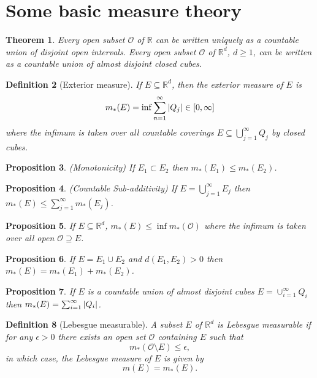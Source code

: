 \documentclass[11pt, letter]{book}
\newtheorem{theorem}{Theorem}[section]
\newtheorem{definition}[theorem]{Definition}
\newtheorem{proposition}[theorem]{Proposition}
\newcommand\R{\mathbb{R}}
\begin{document}



\section{Some basic measure theory}\label{sec:measure_theory}
\begin{theorem}
Every open subset $\mathcal{O}$ of $\mathbb{R}$ can be written uniquely as a countable union of disjoint open intervals. Every open subset $\mathcal{O}$ of $\mathbb{R}^d$, $d\geq 1$, can be written as a countable union of almost disjoint closed cubes. 
\end{theorem}
\begin{definition}[Exterior measure]
If $E \subseteq \mathbb{R}^d$, then the exterior measure of $E$ is 
\begin{equation*}
    m_*(E) = \inf \sum^\infty_{n=1}\abs{Q_j} \in [0,\infty]
\end{equation*}
where the infimum is taken over all countable coverings $E\subseteq \bigcup^\infty_{j=1} Q_j$ by closed cubes.
\end{definition}
\begin{proposition}
(Monotonicity) If $E_1 \subset E_2$ then $m_*(E_1)\leq m_*(E_2)$.
\end{proposition}
\begin{proposition}
(Countable Sub-additivity) If $E = \bigcup^\infty_{j=1} E_j$ then $m_*(E) \leq \sum^\infty_{j=1} m_*(E_j)$.
\end{proposition}
\begin{proposition}
If $E \subseteq \mathbb{R}^d$, $m_*(E) \leq \inf m_*(\mathcal{O})$ where the infimum is taken over all open $\mathcal{O} \supseteq E$. 
\end{proposition}
\begin{proposition}
If $E = E_1 \cup E_2$ and $d(E_1, E_2) > 0$ then $m_*(E) = m_*(E_1) + m_*(E_2)$.
\end{proposition}
\begin{proposition}
If $E$ is a countable union of almost disjoint cubes $E = \cup^\infty_{i=1}Q_i$ then $m_*(E) = \sum^\infty_{i=1}\abs{Q_i}$.
\end{proposition}
\begin{definition}[Lebesgue measurable]
    A subset $E$ of $\R^d$ is Lebesgue measurable if for any $\epsilon > 0$ there exists an open set $\mathcal{O}$ containing $E$ such that 
    \begin{equation*}
        m_*(\mathcal{O}\setminus E) \leq \epsilon,
    \end{equation*}
    in which case, the Lebesgue measure of $E$ is given by
    \begin{equation*}
        m(E) = m_*(E).
    \end{equation*}
\end{definition}
\end{document}
